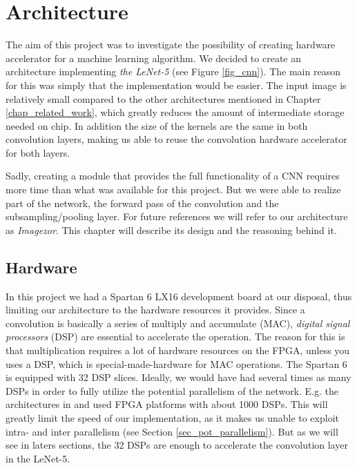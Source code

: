 \chapter{Architecture} \label{architecture}

The aim of this project was to investigate the possibility of creating hardware accelerator for a machine learning algorithm. We decided to create an architecture implementing \textit{the LeNet-5} \cite{LeCun1998} (see Figure \ref{fig_cnn}). The main reason for this was simply that the implementation would be easier. The input image is relatively small compared to the other architectures mentioned in Chapter \ref{chap_related_work}, which greatly reduces the amount of intermediate storage needed on chip. In addition the size of the kernels are the same in both convolution layers, making us able to reuse the convolution hardware accelerator for both layers. 

Sadly, creating a module that provides the full functionality of a CNN requires more time than what was available for this project. But we were able to realize part of the network, the forward pass of the convolution and the subsampling/pooling layer. For future references we will refer to our architecture as \textit{Imagezor}. This chapter will describe its design and the reasoning behind it. 


\section{Hardware}

In this project we had a Spartan 6 LX16 development board at our disposal, thus limiting our architecture to the hardware resources it provides. Since a convolution is basically a series of multiply and accumulate (MAC), \textit{digital signal processors} (DSP) are essential to accelerate the operation. The reason for this is that multiplication requires a lot of hardware resources on the FPGA, unless you uses a DSP, which is special-made-hardware for MAC operations. The Spartan 6 is equipped with 32 DSP slices. Ideally, we would have had several times as many DSPs in order to fully utilize the potential parallelism of the network. E.g. the architectures in \cite{Farabet2009} \cite{Farabet2010} \cite{Chakradhar2010} and \cite{Paper} used FPGA platforms with about 1000 DSPs. This will greatly limit the speed of our implementation, as it makes us unable to exploit intra- and inter parallelism (see Section \ref{sec_pot_parallelism}). But as we will see in laters sections, the 32 DSPs are enough to accelerate the convolution layer in the LeNet-5. 

